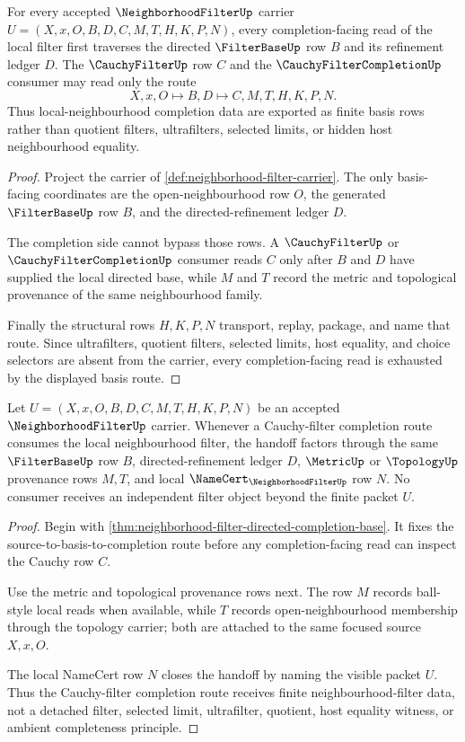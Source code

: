 \begin{theorem}
\label{thm:neighborhood-filter-directed-completion-base}
For every accepted $\NeighborhoodFilterUp$ carrier $U=(X,x,O,B,D,C,M,T,H,K,P,N)$, every completion-facing read of the local filter first traverses the directed $\FilterBaseUp$ row $B$ and its refinement ledger $D$. The $\CauchyFilterUp$ row $C$ and the $\CauchyFilterCompletionUp$ consumer may read only the route
$$
X,x,O \longmapsto B,D \longmapsto C,M,T,H,K,P,N .
$$
Thus local-neighbourhood completion data are exported as finite basis rows rather than quotient filters, ultrafilters, selected limits, or hidden host neighbourhood equality.
\end{theorem}
\begin{proof}
Project the carrier of \autoref{def:neighborhood-filter-carrier}. The only basis-facing coordinates are the open-neighbourhood row $O$, the generated $\FilterBaseUp$ row $B$, and the directed-refinement ledger $D$.

The completion side cannot bypass those rows. A $\CauchyFilterUp$ or $\CauchyFilterCompletionUp$ consumer reads $C$ only after $B$ and $D$ have supplied the local directed base, while $M$ and $T$ record the metric and topological provenance of the same neighbourhood family.

Finally the structural rows $H,K,P,N$ transport, replay, package, and name that route. Since ultrafilters, quotient filters, selected limits, host equality, and choice selectors are absent from the carrier, every completion-facing read is exhausted by the displayed basis route.
\end{proof}

\begin{theorem}
\label{thm:neighborhood-filter-local-cauchy-handoff}
Let $U=(X,x,O,B,D,C,M,T,H,K,P,N)$ be an accepted $\NeighborhoodFilterUp$ carrier. Whenever a Cauchy-filter completion route consumes the local neighbourhood filter, the handoff factors through the same $\FilterBaseUp$ row $B$, directed-refinement ledger $D$, $\MetricUp$ or $\TopologyUp$ provenance rows $M,T$, and local $\NameCert_{\NeighborhoodFilterUp}$ row $N$. No consumer receives an independent filter object beyond the finite packet $U$.
\end{theorem}
\begin{proof}
Begin with \autoref{thm:neighborhood-filter-directed-completion-base}. It fixes the source-to-basis-to-completion route before any completion-facing read can inspect the Cauchy row $C$.

Use the metric and topological provenance rows next. The row $M$ records ball-style local reads when available, while $T$ records open-neighbourhood membership through the topology carrier; both are attached to the same focused source $X,x,O$.

The local NameCert row $N$ closes the handoff by naming the visible packet $U$. Thus the Cauchy-filter completion route receives finite neighbourhood-filter data, not a detached filter, selected limit, ultrafilter, quotient, host equality witness, or ambient completeness principle.
\end{proof}


